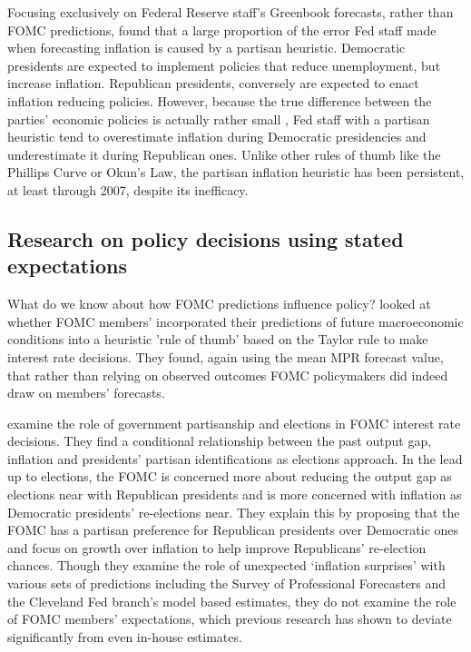 \documentclass[a4paper]{article}\usepackage[]{graphicx}\usepackage[]{color}
\begin{document}
Focusing exclusively on Federal Reserve staff's Greenbook forecasts, rather than FOMC predictions, \cite{gandrud2013does} found that a large proportion of the error Fed staff made when forecasting inflation is caused by a partisan heuristic. Democratic presidents are expected to implement policies that reduce unemployment, but increase inflation. Republican presidents, conversely are expected to enact inflation reducing policies. However, because the true difference between the parties' economic policies is actually rather small \citep{Bartels2008}, Fed staff with a partisan heuristic tend to overestimate inflation during Democratic presidencies and underestimate it during Republican ones. Unlike other rules of thumb like the Phillips Curve or Okun's Law, the partisan inflation heuristic has been persistent, at least through 2007, despite its inefficacy.

\subsection{Research on policy decisions using stated expectations}

What do we know about how FOMC predictions influence policy? \cite{Orphanides2008} looked at whether FOMC members' incorporated their predictions of future macroeconomic conditions into  a heuristic 'rule of thumb' based on the Taylor rule \citeyearpar{Taylor1993} to make interest rate decisions. They found, again using the mean MPR forecast value, that rather than relying on observed outcomes FOMC policymakers did indeed draw on members' forecasts.   

\cite{Clark2013} examine the role of government partisanship and elections in FOMC interest rate decisions. They find a conditional relationship between the past output gap, inflation and presidents' partisan identifications as elections approach. In the lead up to elections, the FOMC is concerned more about reducing the output gap as elections near with Republican presidents and is more concerned with inflation as Democratic presidents' re-elections near. They explain this by proposing that the FOMC has a partisan preference for Republican presidents over Democratic ones and focus on growth over inflation to help improve Republicans' re-election chances. Though they examine the role of unexpected `inflation surprises' with various sets of predictions including the Survey of Professional Forecasters and the Cleveland Fed branch's model based estimates, they do not examine the role of FOMC members' expectations, which previous research has shown to deviate significantly from even in-house estimates.
\end{document}
